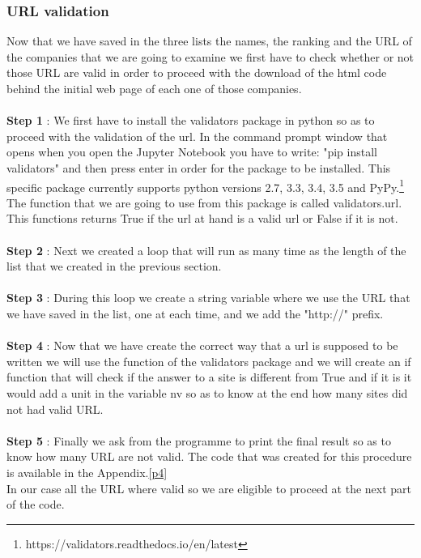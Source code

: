 \documentclass{article}
\begin{document}
\subsubsection{URL validation}
Now that we have saved in the three lists the names, the ranking and the URL of the companies that we are going to examine we first have to check whether or not those URL are valid in order to proceed with the download of the html code behind the initial web page of each one of those companies.\\\\
\textbf{Step 1} : We first have to install the validators package in python so as to proceed with the validation of the url. In the command prompt window that opens when you open the Jupyter Notebook you have to write: "pip install validators" and then press enter in order for the package to be installed. This specific package currently supports python versions 2.7, 3.3, 3.4, 3.5 and PyPy.\footnote{https://validators.readthedocs.io/en/latest} The function that we are going to use from this package is called validators.url. This functions returns True if the url at hand is a valid url or False if it is not.\\\\
\textbf{Step 2} : Next we created a loop that will run as many time as the length of the list that we created in the previous section.\\\\
\textbf{Step 3} : During this loop we create a string variable where we use the URL that we have saved in the list, one at each time, and we add the "http://" prefix.\\\\
\textbf{Step 4} : Now that we have create the correct way that a url is supposed to be written we will use the function of the validators package and we will create an if function that will check if the answer to a site is different from True and if it is it would add a unit in the variable nv so as to know at the end how many sites did not had valid URL.\\\\
\textbf{Step 5} : Finally we ask from the programme to print the final result so as to know how many URL are not valid. The code that was created for this procedure is available in the Appendix.\ref{p4}\\
In our case all the URL where valid so we are eligible to proceed at the next part of the code.
\end{document}
